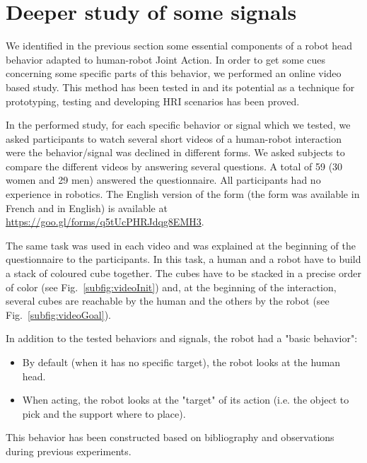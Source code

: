 \documentclass[english,a4paper,11pt,twoside]{StyleThese}
\begin{document}
\section{Deeper study of some signals}

We identified in the previous section some essential components of a robot head behavior adapted to human-robot Joint Action. In order to get some cues concerning some specific parts of this behavior, we performed an online video based study. This method has been tested in \cite{woods2006comparing} and its potential as a technique for prototyping, testing and developing HRI scenarios has been proved.

In the performed study, for each specific behavior or signal which we tested, we asked participants to watch several short videos of a human-robot interaction were the behavior/signal was declined in different forms. We asked subjects to compare the different videos by answering several questions. A total of 59 (30 women and 29 men) answered the questionnaire. All participants had no experience in robotics. The English version of the form (the form was available in French and in English) is available at \url{https://goo.gl/forms/q5tUcPHRJdqg8EMH3}.

The same task was used in each video and was explained at the beginning of the questionnaire to the participants. In this task, a human and a robot have to build a stack of coloured cube together. The cubes have to be stacked in a precise order of color (see Fig.~\ref{subfig:videoInit}) and, at the beginning of the interaction, several cubes are reachable by the human and the others by the robot (see Fig.~\ref{subfig:videoGoal}). 

In addition to the tested behaviors and signals, the robot had a "basic behavior":
\begin{itemize}
\item By default (when it has no specific target), the robot looks at the human head. 
\item When acting, the robot looks at the "target" of its action (i.e. the object to pick and the support where to place).
\end{itemize}
This behavior has been constructed based on bibliography and observations during previous experiments.
\end{document}
